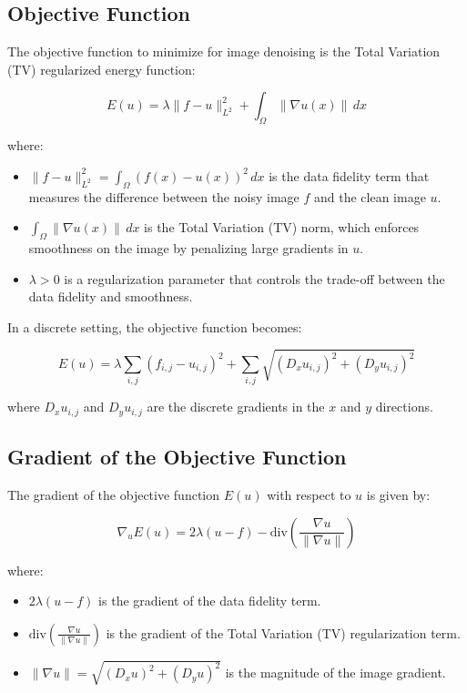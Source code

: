 \documentclass[a4paper,12pt]{article}
\begin{document}
\subsection{Objective Function}

The objective function to minimize for image denoising is the Total Variation (TV)\cite{rudin_osher_fatemi}
regularized energy function:

\[
E(u) = \lambda \| f - u \|^2_{L^2} + \int_{\Omega} \| \nabla u(x) \| \, dx
\]

where:
\begin{itemize}
    \item \( \| f - u \|^2_{L^2} = \int_{\Omega} (f(x) - u(x))^2 \, dx \) is the data fidelity term that measures the difference between the noisy image \( f \) and the clean image \( u \).
    \item \( \int_{\Omega} \| \nabla u(x) \| \, dx \) is the Total Variation (TV) norm, which enforces smoothness on the image by penalizing large gradients in \( u \).
    \item \( \lambda > 0 \) is a regularization parameter that controls the trade-off between the data fidelity and smoothness.
\end{itemize}

In a discrete setting, the objective function becomes:

\[
E(u) = \lambda \sum_{i,j} (f_{i,j} - u_{i,j})^2 + \sum_{i,j} \sqrt{(D_x u_{i,j})^2 + (D_y u_{i,j})^2}
\]

where \( D_x u_{i,j} \) and \( D_y u_{i,j} \) are the discrete gradients in the \( x \) and \( y \) directions.

\subsection{Gradient of the Objective Function}

The gradient of the objective function \( E(u) \) with respect to \( u \) is given by:

\[
\nabla_u E(u) = 2 \lambda (u - f) - \text{div} \left( \frac{\nabla u}{\| \nabla u \|} \right)
\]

where:
\begin{itemize}
    \item \( 2 \lambda (u - f) \) is the gradient of the data fidelity term.
    \item \( \text{div} \left( \frac{\nabla u}{\| \nabla u \|} \right) \) is the gradient of the Total Variation (TV) regularization term.
    \item \( \| \nabla u \| = \sqrt{(D_x u)^2 + (D_y u)^2} \) is the magnitude of the image gradient.
\end{itemize}
\end{document}
